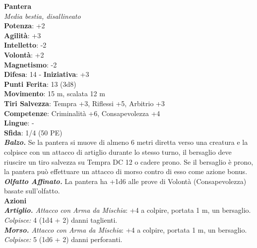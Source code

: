 \begin{multicols}{2}
\medskip\textbf{Pantera}\\
\emph{Media bestia, disallineato}\\
\textbf{Potenza}: +2\\
\textbf{Agilità}: +3\\
\textbf{Intelletto}: -2\\
\textbf{Volontà}: +2\\
\textbf{Magnetismo}: -2\\
\textbf{Difesa}: 14 - \textbf{Iniziativa}: +3\\
\textbf{Punti Ferita}: 13 (3d8)\\
\textbf{Movimento}: 15 m, scalata 12 m\\
\textbf{Tiri Salvezza}: Tempra +3, Riflessi +5, Arbitrio +3 \\
\textbf{Competenze}: Criminalità +6, Consapevolezza +4\\
\textbf{Lingue}: -\\
\textbf{Sfida}: 1/4 (50 PE)\smallskip\\
\emph{\textbf{Balzo.}} Se la pantera si muove di almeno 6 metri diretta verso una creatura e la colpisce con un attacco di artiglio durante lo stesso turno, il bersaglio deve riuscire un tiro salvezza su Tempra DC 12 o cadere prono. Se il bersaglio è prono, la pantera può effettuare un attacco di morso contro di esso come azione bonus.\\
\emph{\textbf{Olfatto Affinato.}} La pantera ha +1d6 alle prove di Volontà (Consapevolezza) basate sull'olfatto.\\
\smallskip\textbf{Azioni}\\
\emph{\textbf{Artiglio.} Attacco con Arma da Mischia}: +4 a colpire, portata 1 m, un bersaglio.\\
\emph{Colpisce:} 4 (1d4 + 2) danni taglienti.\\
\emph{\textbf{Morso.} Attacco con Arma da Mischia}: +4 a colpire, portata 1 m, un bersaglio.\\
\emph{Colpisce:} 5 (1d6 + 2) danni perforanti.\\


\end{multicols}
